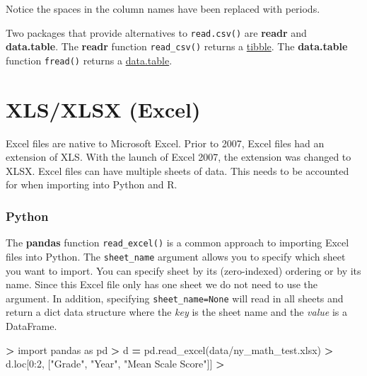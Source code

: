 \documentclass[
]{book}
\newenvironment{Shaded}{\begin{snugshade}}{\end{snugshade}}
\newcommand{\DecValTok}[1]{\textcolor[rgb]{0.00,0.00,0.81}{#1}}
\newcommand{\ImportTok}[1]{#1}
\newcommand{\NormalTok}[1]{#1}
\newcommand{\OperatorTok}[1]{\textcolor[rgb]{0.81,0.36,0.00}{\textbf{#1}}}
\newcommand{\StringTok}[1]{\textcolor[rgb]{0.31,0.60,0.02}{#1}}
\begin{document}
Notice the spaces in the column names have been replaced with periods.

Two packages that provide alternatives to \texttt{read.csv()} are \textbf{readr} and \textbf{data.table}. The \textbf{readr} function \texttt{read\_csv()} returns a \href{https://r4ds.had.co.nz/tibbles.html}{tibble}. The \textbf{data.table} function \texttt{fread()} returns a \href{https://rdatatable.gitlab.io/data.table/articles/datatable-intro.html}{data.table}.

\hypertarget{xlsxlsx-excel}{%
\section{XLS/XLSX (Excel)}\label{xlsxlsx-excel}}

Excel files are native to Microsoft Excel. Prior to 2007, Excel files had an extension of XLS. With the launch of Excel 2007, the extension was changed to XLSX. Excel files can have multiple sheets of data. This needs to be accounted for when importing into Python and R.

\hypertarget{python-11}{%
\subsubsection*{Python}\label{python-11}}

The \textbf{pandas} function \texttt{read\_excel()} is a common approach to importing Excel files into Python. The \texttt{sheet\_name} argument allows you to specify which sheet you want to import. You can specify sheet by its (zero-indexed) ordering or by its name. Since this Excel file only has one sheet we do not need to use the argument. In addition, specifying \texttt{sheet\_name=None} will read in all sheets and return a dict data structure where the \emph{key} is the sheet name and the \emph{value} is a DataFrame.

\begin{Shaded}
\begin{Highlighting}[]
\OperatorTok{\textgreater{}} \ImportTok{import}\NormalTok{ pandas }\ImportTok{as}\NormalTok{ pd  }
\OperatorTok{\textgreater{}}\NormalTok{ d }\OperatorTok{=}\NormalTok{ pd.read\_excel(}\StringTok{\textquotesingle{}data/ny\_math\_test.xlsx\textquotesingle{}}\NormalTok{)  }
\OperatorTok{\textgreater{}}\NormalTok{ d.loc[}\DecValTok{0}\NormalTok{:}\DecValTok{2}\NormalTok{, [}\StringTok{"Grade"}\NormalTok{, }\StringTok{"Year"}\NormalTok{, }\StringTok{"Mean Scale Score"}\NormalTok{]]  }
\OperatorTok{\textgreater{}} 
\end{Highlighting}
\end{Shaded}
\end{document}
